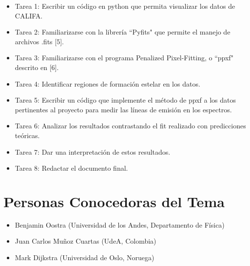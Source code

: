 \documentclass[12pt]{article}
\begin{document}
\begin{itemize}
    \item Tarea 1: Escribir un c\'odigo en python que permita visualizar los datos de CALIFA.
    \item Tarea 2: Familiarizarse con la librer\'ia ``Pyfits" que
      permite el manejo de archivos .fits [5]. 
    \item Tarea 3: Familiarizarse con el programa Penalized
      Pixel-Fitting, o ``ppxf" descrito en [6].  
    \item Tarea 4: Identificar regiones de formaci\'on estelar en
      los datos. 
    \item Tarea 5: Escribir un c\'odigo que implemente el m\'etodo de
      ppxf a los datos pertinentes al proyecto para medir las l\'ineas
      de emisi\'on en los espectros.
    \item Tarea 6: Analizar los resultados contrastando el fit
      realizado con predicciones te\'oricas.
    \item Tarea 7: Dar una interpretaci\'on de estos resultados.	
    \item Tarea 8: Redactar el documento final.
\end{itemize}

\section{Personas Conocedoras del Tema}


\begin{itemize}
	\item Benjamin Oostra (Universidad de los Andes, Departamento de F\'isica)
	\item Juan Carlos Mu\~noz Cuartas (UdeA, Colombia)
	\item Mark Dijkstra (Universidad de Oslo, Noruega)
\end{itemize}
\end{document}

